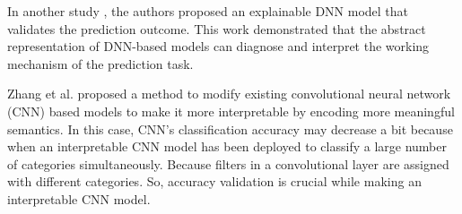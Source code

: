 In another study \cite{du2018towards}, the authors proposed an explainable DNN model that validates the prediction outcome. This work demonstrated that the abstract representation of DNN-based models can diagnose and interpret the working mechanism of the prediction task. 

Zhang et al. \cite{zhang2018interpretable} proposed a method to modify existing convolutional neural network (CNN) based models to make it more interpretable by encoding more meaningful semantics. In this case, CNN's classification accuracy may decrease a bit because when an interpretable CNN model has been deployed to classify a large number of categories simultaneously. Because filters in a convolutional layer are assigned with different categories. So, accuracy validation is crucial while making an interpretable CNN model.
